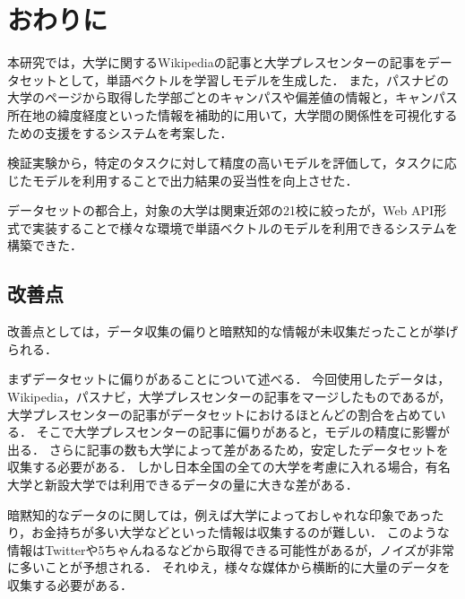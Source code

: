 \chapter{おわりに}
本研究では，大学に関するWikipediaの記事と大学プレスセンターの記事をデータセットとして，単語ベクトルを学習しモデルを生成した．
また，パスナビの大学のページから取得した学部ごとのキャンパスや偏差値の情報と，キャンパス所在地の緯度経度といった情報を補助的に用いて，大学間の関係性を可視化するための支援をするシステムを考案した．

検証実験から，特定のタスクに対して精度の高いモデルを評価して，タスクに応じたモデルを利用することで出力結果の妥当性を向上させた．

データセットの都合上，対象の大学は関東近郊の21校に絞ったが，Web API形式で実装することで様々な環境で単語ベクトルのモデルを利用できるシステムを構築できた．

\section{改善点}
改善点としては，データ収集の偏りと暗黙知的な情報が未収集だったことが挙げられる．

まずデータセットに偏りがあることについて述べる．
今回使用したデータは，Wikipedia，パスナビ，大学プレスセンターの記事をマージしたものであるが，大学プレスセンターの記事がデータセットにおけるほとんどの割合を占めている．
そこで大学プレスセンターの記事に偏りがあると，モデルの精度に影響が出る．
さらに記事の数も大学によって差があるため，安定したデータセットを収集する必要がある．
しかし日本全国の全ての大学を考慮に入れる場合，有名大学と新設大学では利用できるデータの量に大きな差がある．

暗黙知的なデータのに関しては，例えば大学によっておしゃれな印象であったり，お金持ちが多い大学などといった情報は収集するのが難しい．
このような情報はTwitterや5ちゃんねるなどから取得できる可能性があるが，ノイズが非常に多いことが予想される．
それゆえ，様々な媒体から横断的に大量のデータを収集する必要がある．